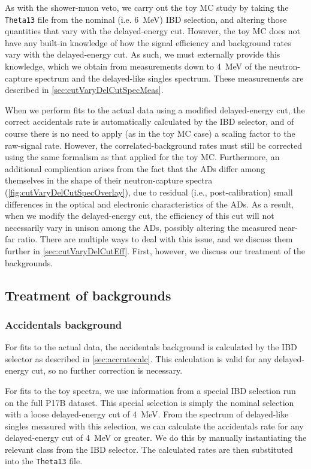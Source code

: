 \documentclass[../thesis.tex]{subfiles}
\begin{document}
As with the shower-muon veto, we carry out the toy MC study by taking the \texttt{Theta13} file from the nominal (i.e. 6~MeV) IBD selection, and altering those quantities that vary with the delayed-energy cut. However, the toy MC does not have any built-in knowledge of how the signal efficiency and background rates vary with the delayed-energy cut. As such, we must externally provide this knowledge, which we obtain from measurements down to 4~MeV of the neutron-capture spectrum and the delayed-like singles spectrum. These measurements are described in \autoref{sec:cutVaryDelCutSpecMeas}.

When we perform fits to the actual data using a modified delayed-energy cut, the correct accidentals rate is automatically calculated by the IBD selector, and of course there is no need to apply (as in the toy MC case) a scaling factor to the raw-signal rate. However, the correlated-background rates must still be corrected using the same formalism as that applied for the toy MC\@.  Furthermore, an additional complication arises from the fact that the ADs differ among themselves in the shape of their neutron-capture spectra (\autoref{fig:cutVaryDelCutSpecOverlay}), due to residual (i.e., post-calibration) small differences in the optical and electronic characteristics of the ADs. As a result, when we modify the delayed-energy cut, the efficiency of this cut will not necessarily vary in unison among the ADs, possibly altering the measured near-far ratio. There are multiple ways to deal with this issue, and we discuss them further in \autoref{sec:cutVaryDelCutEff}. First, however, we discuss our treatment of the backgrounds.

\subsection{Treatment of backgrounds}
\label{sec:cutVaryDelayedCutBkgTreatment}

\subsubsection{Accidentals background}

For fits to the actual data, the accidentals background is calculated by the IBD selector as described in \autoref{sec:accratecalc}. This calculation is valid for any delayed-energy cut, so no further correction is necessary.

For fits to the toy spectra, we use information from a special IBD selection run on the full P17B dataset. This special selection is simply the nominal selection with a loose delayed-energy cut of 4~MeV. From the spectrum of delayed-like singles measured with this selection, we can calculate the accidentals rate for any delayed-energy cut of 4~MeV or greater. We do this by manually instantiating the relevant class from the IBD selector. The calculated rates are then substituted into the \texttt{Theta13} file.
\end{document}
